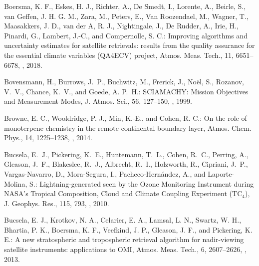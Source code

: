 \documentclass[amt]{copernicus}
\begin{document}
\begin{thebibliography}{105}
 Boersma, K. F., Eskes, H. J., Richter, A., De Smedt, I., Lorente, A., Beirle, S., van Geffen, J. H. G. M., Zara, M., Peters, E., Van Roozendael, M., Wagner, T., Maasakkers, J. D., van der A, R. J., Nightingale, J., De Rudder, A., Irie, H., Pinardi, G., Lambert, J.-C., and Compernolle, S. C.: Improving algorithms and uncertainty estimates for satellite  retrievals: results from the quality assurance for the essential climate variables (QA4ECV) project, Atmos. Meas. Tech., 11, 6651--6678, , 2018.

Bovensmann, H., Burrows, J.~P., Buchwitz, M., Frerick, J., Noël, S., Rozanov,
  V.~V., Chance, K.~V., and Goede, A. P.~H.: SCIAMACHY: Mission Objectives and
  Measurement Modes, J. Atmos. Sci., 56, 127--150,
  , 1999.

Browne, E. C., Wooldridge, P. J., Min, K.-E., and Cohen, R. C.: On the role of monoterpene chemistry in the remote continental boundary layer, Atmos. Chem. Phys., 14, 1225–1238, , 2014.

Bucsela, E.~J., Pickering, K.~E., Huntemann, T.~L., Cohen, R.~C., Perring, A.,
  Gleason, J.~F., Blakeslee, R.~J., Albrecht, R.~I., Holzworth, R., Cipriani,
  J.~P., Vargas-Navarro, D., Mora-Segura, I., Pacheco-Hernández, A., and
  Laporte-Molina, S.: Lightning-generated  seen by the Ozone
  Monitoring Instrument during NASA's Tropical Composition, Cloud and Climate
  Coupling Experiment (TC$_{4}$), J. Geophys. Res.,
  115, 793, , 2010.

 Bucsela, E. J., Krotkov, N. A., Celarier, E. A., Lamsal, L. N., Swartz, W. H., Bhartia, P. K., Boersma, K. F., Veefkind, J. P., Gleason, J. F., and Pickering, K. E.: A new stratospheric and tropospheric  retrieval algorithm for nadir-viewing satellite instruments: applications to OMI, Atmos. Meas. Tech., 6, 2607–2626, , 2013.


\end{thebibliography}
\end{document}

